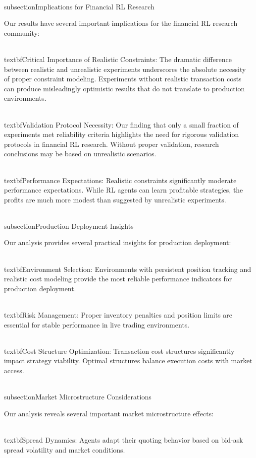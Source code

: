 \documentclass[11pt,a4paper]{article}
\begin{document}
\\subsection{Implications for Financial RL Research}

Our results have several important implications for the financial RL research community:

\\textbf{Critical Importance of Realistic Constraints}: The dramatic difference between realistic and unrealistic experiments underscores the absolute necessity of proper constraint modeling. Experiments without realistic transaction costs can produce misleadingly optimistic results that do not translate to production environments.

\\textbf{Validation Protocol Necessity}: Our finding that only a small fraction of experiments met reliability criteria highlights the need for rigorous validation protocols in financial RL research. Without proper validation, research conclusions may be based on unrealistic scenarios.

\\textbf{Performance Expectations}: Realistic constraints significantly moderate performance expectations. While RL agents can learn profitable strategies, the profits are much more modest than suggested by unrealistic experiments.

\\subsection{Production Deployment Insights}

Our analysis provides several practical insights for production deployment:

\\textbf{Environment Selection}: Environments with persistent position tracking and realistic cost modeling provide the most reliable performance indicators for production deployment.

\\textbf{Risk Management}: Proper inventory penalties and position limits are essential for stable performance in live trading environments.

\\textbf{Cost Structure Optimization}: Transaction cost structures significantly impact strategy viability. Optimal structures balance execution costs with market access.

\\subsection{Market Microstructure Considerations}

Our analysis reveals several important market microstructure effects:

\\textbf{Spread Dynamics}: Agents adapt their quoting behavior based on bid-ask spread volatility and market conditions.
\end{document}
